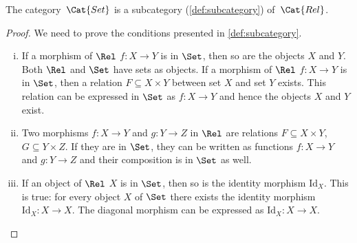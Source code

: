 \begin{lemma}
    The category~$\Cat{Set}$ is a subcategory (\cref{def:subcategory}) of~$\Cat{Rel}$.
\end{lemma}
\begin{proof}
	We need to prove the conditions presented in \cref{def:subcategory}.
	\begin{enumerate}[(i)]
	\item If a morphism of $\Rel$ $f \colon X\to Y$ is in $\Set$, then so are the objects $X$ and $Y$. Both $\Rel$ and $\Set$ have sets as objects. If a morphism of $\Rel$ $f\colon X\to Y$ is in $\Set$, then a relation $F\subseteq X\times Y$ between set $X$ and set $Y$ exists. This relation can be expressed in $\Set$ as $f\colon X\to Y$ and hence the objects $X$ and $Y$ exist.
	\item Two morphisms $f\colon X\to Y$ and $g\colon Y\to Z$ in $\Rel$ are relations $F\subseteq X\times Y$, $G\subseteq Y\times Z$. If they are in $\Set$, they can be written as functions $f\colon X\to Y$ and $g\colon Y\to Z$ and their composition is in $\Set$ as well. 
	\item If an object of $\Rel$ $X$ is in $\Set$, then so is the identity morphism $\text{Id}_X$. This is true: for every object $X$ of $\Set$ there exists the identity morphism $\text{Id}_X:X\to X$. The diagonal morphism can be expressed as $\text{Id}_X:X\to X$.
	\end{enumerate}
\end{proof}
